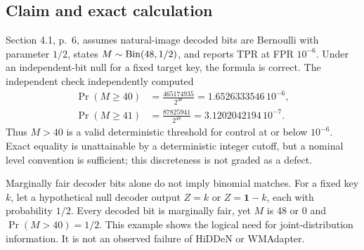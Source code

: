 \documentclass[10pt]{article}
\begin{document}
\subsection*{Claim and exact calculation}
Section 4.1, p. 6, assumes natural-image decoded bits are Bernoulli with parameter \(1/2\), states \(M\sim{\rm Bin}(48,1/2)\), and reports TPR at FPR \(10^{-6}\). Under an independent-bit null for a fixed target key, the formula is correct. The independent check independently computed \[\begin{aligned}
 \Pr(M\ge40)&=\frac{465174935}{2^{48}}
 =1.6526333546\,10^{-6},\\
 \Pr(M\ge41)&=\frac{87825941}{2^{48}}
 =3.1202042194\,10^{-7}.
\end{aligned}\] Thus \(M>40\) is a valid deterministic threshold for control at or below \(10^{-6}\). Exact equality is unattainable by a deterministic integer cutoff, but a nominal level convention is sufficient; this discreteness is not graded as a defect.\par
Marginally fair decoder bits alone do not imply binomial matches. For a fixed key \(k\), let a hypothetical null decoder output \(Z=k\) or \(Z=\mathbf1-k\), each with probability \(1/2\). Every decoded bit is marginally fair, yet \(M\) is 48 or 0 and \(\Pr(M>40)=1/2\). This example shows the logical need for joint-distribution information. It is not an observed failure of HiDDeN or WMAdapter.\par
\end{document}
